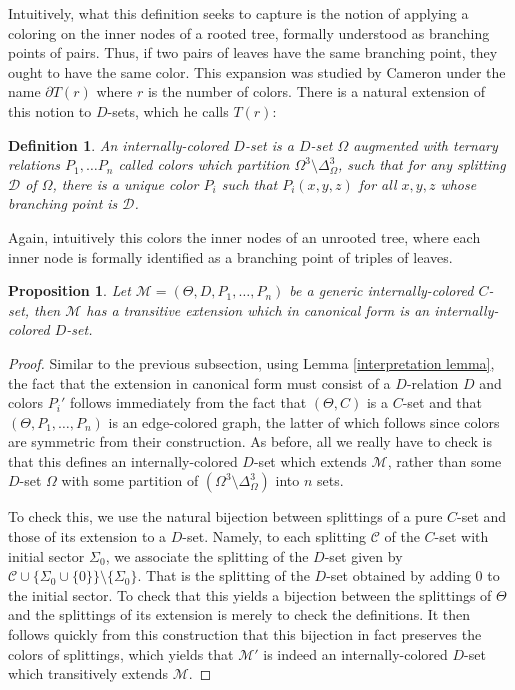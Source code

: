\documentclass{amsart}
\newtheorem{definition}[theorem]{Definition}
\newtheorem{proposition}[theorem]{Proposition}
\newcommand{\set}[1]{\{#1 \}}
\newcommand{\model}{\mathcal{M}}
\begin{document}
 Intuitively, what this definition seeks to capture is the notion of applying a coloring on the inner nodes of a rooted tree, formally understood as branching points of pairs. Thus, if two pairs of leaves have the same branching point, they ought to have the same color. This expansion was studied by Cameron \cite[\S 5]{cameron1987some} under the name $\partial T(r)$ where $r$ is the number of colors. There is a natural extension of this notion to $D$-sets, which he calls $T(r)$:

\begin{definition}
    An \emph{internally-colored $D$-set} is a $D$-set $\Omega$ augmented with ternary relations $P_1, \dots P_n$ called colors which partition $\Omega^3 \setminus \Delta_\Omega^3$, such that for any splitting $\mathcal{D}$ of $\Omega$, there is a unique color $P_i$ such that $P_i(x,y, z)$ for all $x,y,z$ whose branching point is $\mathcal{D}$.
\end{definition}

Again, intuitively this colors the inner nodes of an unrooted tree, where each inner node is formally identified as a branching point of triples of leaves. 

\begin{proposition}
    Let $\model = (\Theta, D, P_1, \dots, P_n)$ be a generic internally-colored $C$-set, then $\model$ has a transitive extension which in canonical form is an internally-colored $D$-set.
\end{proposition}
\begin{proof}
    Similar to the previous subsection, using Lemma \ref{interpretation lemma}, the fact that the extension in canonical form must consist of a $D$-relation $D$ and colors $P_i'$ follows immediately from the fact that $(\Theta, C)$ is a $C$-set and that $(\Theta, P_1, \dots, P_n)$ is an edge-colored graph, the latter of which follows since colors are symmetric from their construction. As before, all we really have to check is that this defines an internally-colored $D$-set which extends $\model$, rather than some $D$-set $\Omega$ with some partition of $(\Omega^3\setminus \Delta_{\Omega}^3)$ into $n$ sets.

    To check this, we use the natural bijection between splittings of a pure $C$-set and those of its extension to a $D$-set. Namely, to each splitting $\mathcal{C}$ of the $C$-set with initial sector $\Sigma_0$, we associate the splitting of the $D$-set given by $\mathcal{C}\cup \set{\Sigma_0 \cup \set{0}} \setminus\set{\Sigma_0}$. That is the splitting of the $D$-set obtained by adding 0 to the initial sector. To check that this yields a bijection between the splittings of $\Theta$ and the splittings of its extension is merely to check the definitions. It then follows quickly from this construction that this bijection in fact preserves the colors of splittings, which yields that $\model'$ is indeed an internally-colored $D$-set which transitively extends $\model$.
\end{proof}
\end{document}
